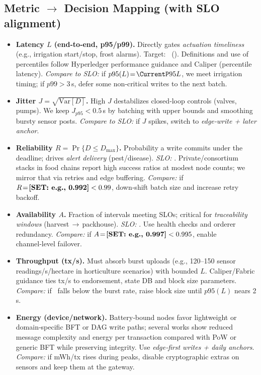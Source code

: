 \documentclass[12pt,onecolumn]{IEEEtran} %
\begin{document}
\subsection{Metric $\rightarrow$ Decision Mapping (with SLO alignment)}
\label{sec:metric-decision}
\begin{itemize}
  \item \textbf{Latency $L$ (end‑to‑end, p95/p99).} Directly gates \emph{actuation timeliness} (e.g., irrigation start/stop, frost alarms). Target: \SLOpL\ (\SLOpLnn). Definitions and use of percentiles follow Hyperledger performance guidance and Caliper (percentile latency)\cite{haque2024scalable}. \emph{Compare to SLO:} if $p95(L)\!=\!\CurrentP95L$, we meet irrigation timing; if $p99>\!3$\,s, defer some non‑critical writes to the next batch.
  \item \textbf{Jitter $J\!=\!\sqrt{\mathrm{Var}[D]}$.} High $J$ destabilizes closed‑loop controls (valves, pumps). We keep $J_{p95}\!<\!0.5$\,s by batching with upper bounds and smoothing bursty sensor posts. \emph{Compare to SLO:} if $J$ spikes, switch to \emph{edge‑write + later anchor}.
  \item \textbf{Reliability $R\!=\!\Pr\{D\le D_{\max}\}$.} Probability a write commits under the deadline; drives \emph{alert delivery} (pest/disease). \emph{SLO:} \SLOR. Private/consortium stacks in food chains report high success ratios at modest node counts; we mirror that via retries and edge buffering\cite{oh2025foodsafety}. \emph{Compare:} if $R\!=\!\textbf{[SET: e.g., 0.992]}<0.99$, down‑shift batch size and increase retry backoff.
  \item \textbf{Availability $A$.} Fraction of intervals meeting SLOs; critical for \emph{traceability windows} (harvest\,$\rightarrow$\,packhouse). \emph{SLO:} \SLOA. Use health checks and orderer redundancy. \emph{Compare:} if $A\!=\!\textbf{[SET: e.g., 0.997]}<0.995$, enable channel‑level failover.
  \item \textbf{Throughput (tx/s).} Must absorb burst uploads (e.g., 120–150 sensor readings/s/hectare in horticulture scenarios) with bounded $L$. Caliper/Fabric guidance ties tx/s to endorsement, state DB and block size parameters\cite{haque2024scalable}. \emph{Compare:} if \CurrentTPS\ falls below the burst rate, raise block size until $p95(L)$ nears 2\,s.
  \item \textbf{Energy (device/network).} Battery‑bound nodes favor lightweight or domain‑specific BFT or DAG write paths; several works show reduced message complexity and energy per transaction compared with PoW or generic BFT while preserving integrity\cite{coinspaid2023dag}. Use \emph{edge‑first writes + daily anchors}. \emph{Compare:} if mWh/tx rises during peaks, disable cryptographic extras on sensors and keep them at the gateway.
\end{itemize}
\end{document}
